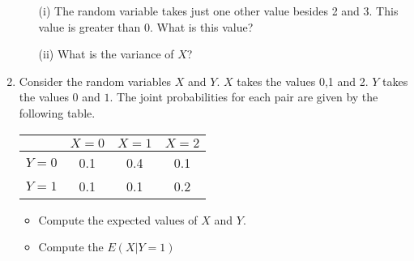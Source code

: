 \documentclass[]{report}
\begin{document}
\begin{enumerate}
	
	\begin{itemize}
		\item[(i)] The random variable takes just one other value besides 2 and 3. This value is greater than 0. What is this value?\\
		\item[(ii)] What is the variance of $X$?
	\end{itemize}

	
\item Consider the random variables $X$ and $Y$. $X$ takes the values 0,1 and 2. $Y$ takes the values $0$ and $1$.
	The joint probabilities for each pair are given by the following table.
	\begin{center}
		\begin{tabular}{|c|c|c|c|}
			\hline  & $X=0$ & $X=1$ & $X=2$  \\ 
			\hline $Y=0$ & 0.1  & 0.4 & 0.1 \\ 
			\hline  $Y=1$ & 0.1 & 0.1 & 0.2 \\ 
			\hline 
		\end{tabular} 
	\end{center}
	\begin{itemize}
		\item Compute the expected values of $X$ and $Y$.
		\item Compute the $E(X|Y=1)$
	\end{itemize}
\end{enumerate}	
\end{document}
